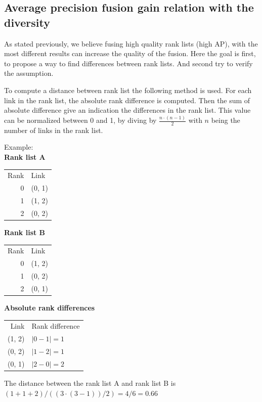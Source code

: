 \clearpage

\subsection{Average precision fusion gain relation with the diversity}

As stated previously, we believe fusing high quality rank lists (high AP), with the most different results can increase the quality of the fusion.
Here the goal is first, to propose a way to find differences between rank lists.
And second try to verify the assumption.

To compute a distance between rank list the following method is used.
For each link in the rank list, the absolute rank difference is computed.
Then the sum of absolute difference give an indication the differences in the rank list.
This value can be normalized between 0 and 1, by diving by $\frac{n\cdot(n-1)}{2}$ with $n$ being the number of links in the rank list.

Example:\\

\textbf{Rank list A}

\begin{tabular}{r l}
Rank & Link\\
   0 & (0, 1)\\
   1 & (1, 2)\\
   2 & (0, 2)\\
\end{tabular}

\textbf{Rank list B}

\begin{tabular}{r l}
Rank & Link\\
   0 & (1, 2)\\
   1 & (0, 2)\\
   2 & (0, 1)\\
\end{tabular}

\textbf{Absolute rank differences}

\begin{tabular}{r l}
Link   & Rank difference\\
(1, 2) & $\left|0 - 1\right| = 1$\\
(0, 2) & $\left|1 - 2\right| = 1$\\
(0, 1) & $\left|2 - 0\right| = 2$\\
\end{tabular}

The distance between the rank list A and rank list B is $(1 + 1 + 2) / ((3 \cdot (3 - 1))/ 2) = 4/6 = 0.66$

